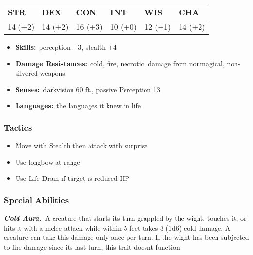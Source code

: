 \documentclass[10pt,twocolumn]{article}
\let\oldtextbf\textbf
\renewcommand{\textbf}[1]{\oldtextbf{{#1}}}
\providecommand{\tightlist}{
  \setlength{\itemsep}{4pt}
  \setlength{\topsep}{0pt}
  \setlength{\parsep}{0pt}
  \setlength{\parskip}{0pt}
  \setlength{\partopsep}{0pt}
}
\begin{document}
\begin{center}
{\sffamily\fontsize{8pt}{8pt}\selectfont
{}
\begin{tabular}{llllll}
\toprule
\textbf{STR} & \textbf{DEX} & \textbf{CON} & \textbf{INT} & \textbf{WIS} & \textbf{CHA} \\
\midrule
14 (+2) & 14 (+2) & 16 (+3) & 10 (+0) & 12 (+1) & 14 (+2) \\
\bottomrule
\end{tabular}}
\end{center}

\setlength{\itemsep}{0pt}

\begin{itemize}
\tightlist
\item
  \textbf{Skills:}~perception +3, stealth +4
\item
  \textbf{Damage Resistances:}~cold, fire, necrotic; damage from
  nonmagical, non-silvered weapons
\item
  \textbf{Senses:}~darkvision 60 ft., passive Perception 13
\item
  \textbf{Languages:}~the languages it knew in life
\end{itemize}

\subsubsection{Tactics}\label{tactics-3}

\setlength{\itemsep}{0pt}

\begin{itemize}
\tightlist
\item
  Move with Stealth then attack with surprise
\item
  Use longbow at range
\item
  Use Life Drain if target is reduced HP
\end{itemize}

\subsubsection{Special Abilities}\label{special-abilities-1}

\textbf{\emph{Cold Aura.}}~A creature that starts its turn grappled by
the wight, touches it, or hits it with a melee attack while within 5
feet takes 3 (1d6) cold damage. A creature can take this damage only
once per turn. If the wight has been subjected to fire damage since its
last turn, this trait doesnt function.
\end{document}
